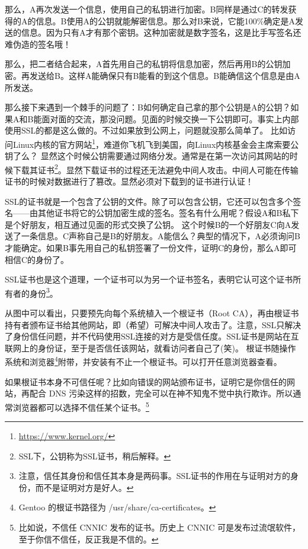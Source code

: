 那么，A再次发送一个信息，使用自己的私钥进行加密。B同样是通过C的转发获得的A的信息。B使用A的公钥就能解密信息。那么对B来说，它能100\%确定是A发送的信息。因为只有A才有那个密钥。这种加密就是数字签名，这是比手写签名还难伪造的签名哦！

那么，把二者结合起来，A首先用自己的私钥将信息加密，然后再用B的公钥加密。再发送给B。这样A能确保只有B能看的到这个信息。B能确信这个信息是由A所发送。

那么接下来遇到一个棘手的问题了：B如何确定自己拿的那个公钥是A的公钥？如果A和B能面对面的交流，那没问题。见面的时候交换一下公钥即可。事实上内部使用SSL的都是这么做的。不过如果放到公网上，问题就没那么简单了。
比如访问Linux内核的官方网站\footnote{\url{https://www.kernel.org/} }，难道你飞机飞到美国，向Linux内核基金会主席索要公钥了么？
显然这个时候公钥需要通过网络分发。通常是在第一次访问其网站的时候下载其证书\footnote{SSL下，公钥称为SSL证书，稍后解释。}。显然下载证书的过程还无法避免中间人攻击。中间人可能在传输证书的时候对数据进行了篡改。显然必须对下载到的证书进行认证！

SSL的证书就是一个包含了公钥的文件。除了可以包含公钥，它还可以包含多个签名——由其他证书将它的公钥加密生成的签名。签名有什么用呢？假设A和B私下是个好朋友，相互通过见面的形式交换了公钥。
这个时候B的一个好朋友C向A发送了一条信息。C声称自己是B的好朋友。A能信么？典型的情况下，A必须询问B才能确定。如果B事先用自己的私钥签署了一份文件，证明C的身份，那么A即可相信C的身份了。

SSL证书也是这个道理，一个证书可以为另一个证书签名，表明它认可这个证书所有者的身份\footnote{注意，信任其身份和信任其本身是两码事。SSL证书的作用在与证明对方的身份，而不是证明对方是好人。}。 


从图中可以看出，只要预先向每个系统植入一个根证书（Root CA），再由根证书持有者颁布证书给其他网站，即（希望）可解决中间人攻击了。注意，SSL只解决了身份信任问题，并不代码使用SSL连接的对方是受信任度。SSL证书是网站在互联网上的身份证，至于是否信任该网站，就看访问者自己了(笑)。
根证书随操作系统和浏览器\footnote{Gentoo 的根证书路径为 /usr/share/ca-certificates。}附带，并安装有不止一个根证书。可以打开任意浏览器查看。



如果根证书本身不可信任呢？比如向错误的网站颁布证书，证明它是你信任的网站，再配合 DNS 污染这样的招数，完全可以在神不知鬼不觉中执行欺诈。所以通常浏览器都可以选择不信任某个证书。\footnote{
比如说，不信任 CNNIC 发布的证书。历史上 CNNIC 可是发布过流氓软件，至于你信不信任，反正我是不信的。}

